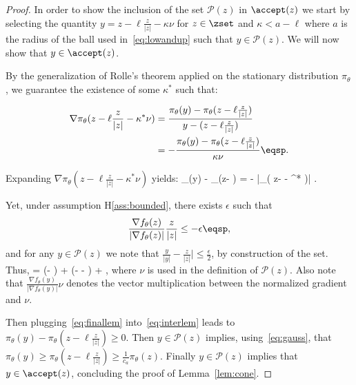 \documentclass{article} %
\begin{document}
\begin{proof}

In order to show the inclusion of the set $\mathcal{P}(z)$ in $\accept(z)$ we start by selecting the quantity $y = z- \ell \frac{z}{|z|} - \kappa \nu$ for $z\in \zset$ and $\kappa < a - \ell $ where $a$ is the radius of the ball used in~\eqref{eq:lowandup} such that $y \in \mathcal{P}(z)$.
We will now show that $y \in \accept(z)$.

By the generalization of Rolle's theorem applied on the stationary distribution $\pi_\theta$, we guarantee the existence of some $\kappa^*$ such that:

\begin{align}
\nabla \pi_\theta( z- \ell \frac{z}{|z|} - \kappa^* \nu) & = \frac{\pi_\theta(y) - \pi_\theta(z- \ell \frac{z}{|z|})}{y - (z- \ell \frac{z}{|z|})} \\
& = - \frac{\pi_\theta(y) - \pi_\theta(z- \ell \frac{z}{|z|})}{\kappa \nu} \eqsp.
\end{align}

Expanding $\nabla \pi_\theta( z- \ell \frac{z}{|z|} - \kappa^* \nu)$ yields:
\beq\label{eq:interlem}
\pi_\theta(y) - \pi_\theta(z- \ell {}) = - \kappa \nu {} |\nabla \pi_\theta( z- \ell {} - \kappa^* \nu)| \eqsp.
\eeq

Yet, under assumption H\ref{ass:bounded}, there exists $\epsilon$ such that 
$$
 \frac{\nabla f_{\theta}(z) }{|\nabla f_{\theta}(z) |}  \frac{z }{|z|} \leq -\epsilon \eqsp,
 $$
 and for any $y \in \mathcal{P}(z)$ we note that $\frac{y }{|y|} - \frac{z }{|z|}|\leq \frac{\epsilon}{2}$, by construction of the set.
 Thus, 
\beq\label{eq:finallem}
    \nu  =   (\nu - ) +   (\nu -  -  ) +     \eqsp,
\eeq
 where $\nu$ is used in the definition of $\mathcal{P}(z)$.
 Also note that $  \frac{\nabla f_{\theta}(y) }{|\nabla f_{\theta}(y) |}  \nu  $ denotes the vector multiplication between the normalized gradient and $\nu$.
 
Then plugging~\eqref{eq:finallem} into~\eqref{eq:interlem} leads to $\pi_\theta(y) - \pi_\theta(z- \ell \frac{z}{|z|}) \geq 0$.
Then $y \in \mathcal{P}(z)$ implies, using~\eqref{eq:gauss}, that $\pi_\theta(y) \geq \pi_\theta(z- \ell \frac{z}{|z|}) \geq \frac{1}{c_a} \pi_\theta(z)$. 
 Finally $y \in \mathcal{P}(z)$ implies that $y \in \accept(z)$, concluding the proof of Lemma~\ref{lem:cone}.
 
\end{proof}
\end{document}

